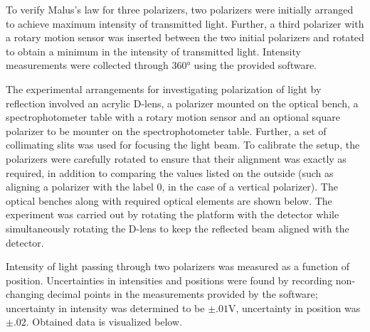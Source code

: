 \begin{paper}
	To verify Malus's law for three polarizers, two polarizers were initially arranged to achieve maximum intensity of transmitted light. Further, a third polarizer with a rotary motion sensor was inserted between the two initial polarizers and rotated to obtain a minimum in the intensity of transmitted light. Intensity measurements were collected through \( 360 \si{\degree} \) using the provided software.
	
	The experimental arrangements for investigating polarization of light by reflection involved an acrylic D-lens, a polarizer mounted on the optical bench, a spectrophotometer table with a rotary motion sensor and an optional square polarizer to be mounter on the spectrophotometer table. Further, a set of collimating slits was used for focusing the light beam. To calibrate the setup, the polarizers were carefully rotated to ensure that their alignment was exactly as required, in addition to comparing the values listed on the outside (such as aligning a polarizer with the label 0, in the case of a vertical polarizer). The optical benches along with required optical elements are shown below. The experiment was carried out by rotating the platform with the detector while simultaneously rotating the D-lens to keep the reflected beam aligned with the detector.
	
	
	
	Intensity of light passing through two polarizers was measured as a function of position. Uncertainties in intensities and positions were found by recording non-changing decimal points in the measurements provided by the software; uncertainty in intensity was determined to be \( \pm .01 \si{\volt} \), uncertainty in position was \( \pm .02\). Obtained data is visualized below.
		

\end{paper}

